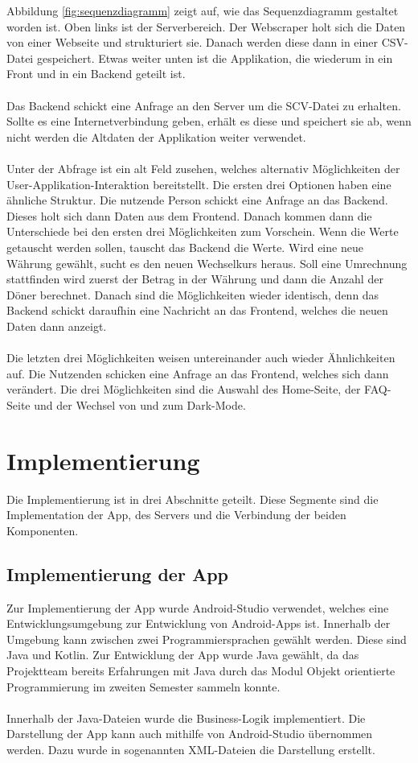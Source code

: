 \documentclass[conference]{IEEEtran}
\begin{document}
Abbildung \ref{fig:sequenzdiagramm} zeigt auf, wie das Sequenzdiagramm gestaltet worden ist. Oben links ist der Serverbereich. Der Webscraper holt sich die Daten von einer Webseite und strukturiert sie. Danach werden diese dann in einer CSV-Datei gespeichert. Etwas weiter unten ist die Applikation, die wiederum in ein Front und in ein Backend geteilt ist. \\\\ Das Backend schickt eine Anfrage an den Server um die SCV-Datei zu erhalten. Sollte es eine Internetverbindung geben, erhält es diese und speichert sie ab, wenn nicht werden die Altdaten der Applikation weiter verwendet. \\\\ Unter der Abfrage ist ein alt Feld zusehen, welches alternativ Möglichkeiten der User-Applikation-Interaktion bereitstellt. Die ersten drei Optionen haben eine ähnliche Struktur. Die nutzende Person schickt eine Anfrage an das Backend. Dieses holt sich dann Daten aus dem Frontend. Danach kommen dann die Unterschiede bei den ersten drei Möglichkeiten zum Vorschein. Wenn die Werte getauscht werden sollen, tauscht das Backend die Werte. Wird eine neue Währung gewählt, sucht es den neuen Wechselkurs heraus. Soll eine Umrechnung stattfinden wird zuerst der Betrag in der Währung und dann die Anzahl der Döner berechnet. Danach sind die Möglichkeiten wieder identisch, denn das Backend schickt daraufhin eine Nachricht an das Frontend, welches die neuen Daten dann anzeigt. \\\\ Die letzten drei Möglichkeiten weisen untereinander auch wieder Ähnlichkeiten auf. Die Nutzenden schicken eine Anfrage an das Frontend, welches sich dann verändert. Die drei Möglichkeiten sind die Auswahl des Home-Seite, der FAQ-Seite und der Wechsel von und zum Dark-Mode.

\section{Implementierung}
Die Implementierung ist in drei Abschnitte geteilt. Diese Segmente sind die Implementation der App, des Servers und die Verbindung der beiden Komponenten.

\subsection{Implementierung der App}
Zur Implementierung der App wurde Android-Studio verwendet, welches eine Entwicklungsumgebung zur Entwicklung von Android-Apps ist. Innerhalb der Umgebung kann zwischen zwei Programmiersprachen gewählt werden. Diese sind Java und Kotlin. Zur Entwicklung der App wurde Java gewählt, da das Projektteam bereits Erfahrungen mit Java  durch das Modul Objekt orientierte Programmierung im zweiten Semester sammeln konnte. \\\\ Innerhalb der Java-Dateien wurde die Business-Logik implementiert. Die Darstellung der App kann auch mithilfe von Android-Studio übernommen werden. Dazu wurde in sogenannten XML-Dateien die Darstellung erstellt.
\end{document}
